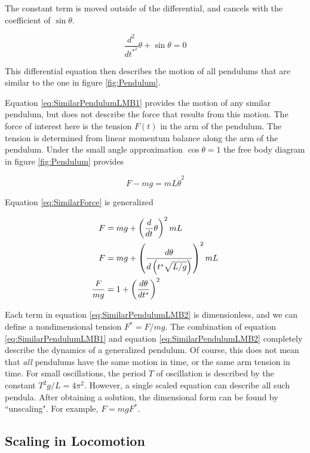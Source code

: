 The constant term is moved outside of the differential, and cancels with the coefficient of $\sin{\theta}$. 

\begin{equation}
\frac{d^{2}}{dt^{*^{2}}}\theta + \sin{\theta} = 0
\label{eq:SimilarPendulumLMB1}
\end{equation}

This differential equation then describes the motion of all pendulums that are similar to the one in figure \ref{fig:Pendulum}. 

Equation \ref{eq:SimilarPendulumLMB1} provides the motion of any similar pendulum, but does not describe the force that results from this motion. The force of interest here is the tension $F(t)$ in the arm of the pendulum. The tension is determined from linear momentum balance along the arm of the pendulum. Under the small angle approximation $\cos{\theta} = 1$ the free body diagram in figure \ref{fig:Pendulum} provides 

\begin{equation}
F -mg = mL \dot{\theta}^{2}
\label{eq:SimilarForce}
\end{equation} 

Equation \ref{eq:SimilarForce} is generalized

\begin{align}
F &= mg + \left(\frac{d}{dt}\theta\right)^2 mL \notag \\
F &= mg + \left(\frac{d\theta}{d\left(t^{*}\sqrt{L/g}\right)}\right)^2 mL \notag \\
\frac{F}{mg} &= 1 + \left(\frac{d\theta}{dt^{*}}\right)^{2}
\label{eq:SimilarPendulumLMB2}
\end{align}

Each term in equation \ref{eq:SimilarPendulumLMB2} is dimensionless, and we can define a nondimensional tension $F^{*} = F/mg$. The combination of equation \ref{eq:SimilarPendulumLMB1} and equation \ref{eq:SimilarPendulumLMB2} completely describe the dynamics of a generalized pendulum. Of course, this does not mean that \textit{all} pendulums have the same motion in time, or the same arm tension in time. For small oscillations, the period $T$ of oscillation is described by the constant $T^{2}g/L = 4\pi^{2}$. However, a single scaled equation can describe all such pendula. After obtaining a solution, the dimensional form can be found by ``unscaling". For example, $F = mgF^{*}$.

\subsection{Scaling in Locomotion}


